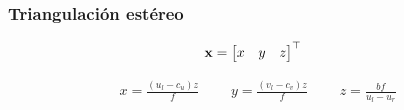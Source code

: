 \documentclass[compress]{beamer}
\begin{document}
\begin{frame}
	\frametitle{Triangulación estéreo}

    \begin{align*}
        \boldsymbol{\mathbf{x}}&=\begin{bmatrix}x & y & z\end{bmatrix}^{\top}
    \end{align*}

	\begin{equation}
		\begin{aligned}x=\frac{(u_{l}-c_{u})z}{f}\;\qquad
		y=\frac{(v_{l}-c_{v})z}{f}\;\qquad
		z=\frac{bf}{u_{l}-u_{r}}\;
		\end{aligned}
	\end{equation}

	\begin{figure}[!htb]
		\centering
		\hfill
		\centering
		\hfill
	\end{figure}

\end{frame}
\end{document}
